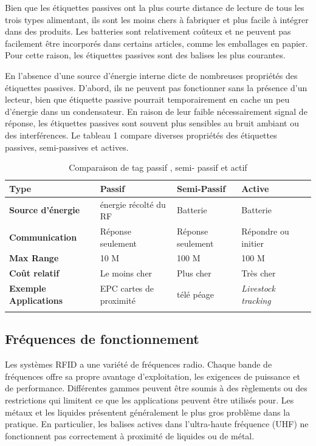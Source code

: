 \documentclass[11pt, a4paper, twoside]{book}
\begin{document}
Bien que les étiquettes passives ont la plus courte distance de lecture de tous les trois types alimentant, ils sont les moins chers à fabriquer et plus facile à intégrer dans des produits. Les batteries sont relativement coûteux et ne peuvent pas facilement être incorporés dans certains articles, comme les emballages en papier. Pour cette raison, les étiquettes passives sont des balises les plus courantes.

En l'absence d'une source d'énergie interne dicte de nombreuses propriétés des étiquettes passives. D'abord, ils ne peuvent pas fonctionner sans la présence d'un lecteur, bien que étiquette passive pourrait temporairement en cache un peu d'énergie dans un condensateur. En raison de leur faible nécessairement signal de réponse, les étiquettes passives sont souvent plus sensibles au bruit ambiant ou des interférences. Le tableau 1 compare diverses propriétés des étiquettes passives, semi-passives et actives.\\

\begin{longtable}{|p{}|p{}|p{}| p{}| p{}|}
\hline
\textbf{Type} & \textbf{Passif} & \textbf{Semi-Passif} & \textbf{Active} \\
\hline
\textbf{Source d'énergie} & énergie récolté du RF & Batterie & Batterie \\
\hline
\textbf{Communication} & Réponse seulement & Réponse seulement & Répondre ou initier \\
\hline
\textbf{Max Range} & 10 M & 100 M &  100 M \\
\hline
\textbf{Coût relatif} & Le moins cher & Plus cher & Très cher \\
\hline
\textbf{Exemple Applications} & EPC cartes de proximité & télé péage &  \emph {Livestock tracking} \\
\hline
\caption{Comparaison de tag passif , semi- passif et actif}
\end{longtable}


\subsection{Fréquences de fonctionnement}
Les systèmes RFID a une variété de fréquences radio. Chaque bande de fréquences offre sa propre avantage d'exploitation, les exigences de puissance et de performance. Différentes gammes peuvent être soumis à des règlements ou des restrictions qui limitent ce que les applications peuvent être utilisés pour.
Les métaux et les liquides présentent généralement le plus gros problème dans la pratique. En particulier, les balises actives dans l'ultra-haute fréquence (UHF) ne fonctionnent pas correctement à proximité de liquides ou de métal.
\end{document}
